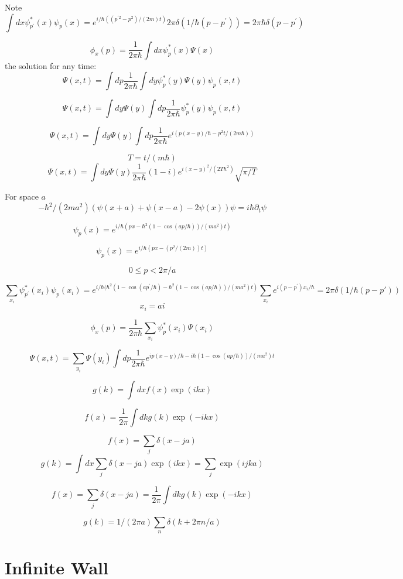 \documentclass[12pt,twoside]{article}
\begin{document}
Note
$$
\int dx \psi_{p^\prime}^*(x) \psi_{p}(x) = e^{ i/\hbar ((p^{\prime2} - p^2) /(2m)t)} 2\pi\delta(1/\hbar(p-p^\prime))
=2\pi\hbar\delta(p-p^\prime)
$$

$$
\phi_x(p) = \frac{1}{2\pi\hbar}\int dx \psi^*_p(x) \Psi(x)
$$
the solution for any time:
$$
\Psi(x, t) = \int dp \frac{1}{2\pi\hbar}\int dy \psi^*_p(y) \Psi(y) \psi_p(x,t)
$$

$$
\Psi(x, t) = \int dy  \Psi(y) \int dp \frac{1}{2\pi\hbar}\psi^*_p(y) \psi_p(x,t)
$$

$$
\Psi(x, t) = \int dy  \Psi(y) \int dp \frac{1}{2\pi\hbar} e^{i(p(x-y)/\hbar - p^2 t/(2m\hbar))}
$$

$$
T=t/(m\hbar)
$$
$$
\Psi(x, t) = \int dy  \Psi(y) \frac{1}{2\pi\hbar} (1-i) e^{i (x-y)^2 / (2 T \hbar^2)}  \sqrt{\pi / T}
$$


For space $a$
$$
-\hbar^2/(2m a^2) (\psi(x+a) + \psi(x-a) - 2\psi(x)) \psi = i \hbar \partial_t \psi
$$

$$
\psi_p(x) = e^{ i/\hbar (p x - \hbar^2(1 - \cos(a p/\hbar))/(m a^2)t)}
$$

$$
\psi_p(x) = e^{ i/\hbar (p x - (p^2/(2m))t)}
$$

$$
0 \le p < 2\pi / a
$$

$$
\sum_{x_i} \psi_{p^\prime}^*(x_i) \psi_{p}(x_i) = e^{ i/\hbar (\hbar^2(1 - \cos(a p^\prime/\hbar) - \hbar^2(1 - \cos(a p/\hbar))/(m a^2)t)}
\sum_{x_i}e^{i(p-p^\prime)x_i/\hbar} = 2\pi\delta(1/\hbar(p - p\prime))
$$
$$
x_i = ai
$$

$$
\phi_x(p) = \frac{1}{2\pi\hbar}\sum_{x_i} \psi^*_p(x_i) \Psi(x_i)
$$

$$
\Psi(x, t) = \sum_{y_i} \Psi(y_i) \int dp \frac{1}{2\pi\hbar} e^{ ip(x-y)/\hbar - i\hbar(1 - \cos(a p/\hbar))/(m a^2)t}
$$



$$
g(k) = \int dx f(x) \exp(ikx)
$$

$$
f(x) = \frac{1}{2\pi}\int dk g(k) \exp(-ikx)
$$

$$
f(x) = \sum_j \delta(x - ja)
$$
$$
g(k) = \int dx \sum_j \delta(x - ja) \exp(ikx) = \sum_j \exp(ijka)
$$

$$
f(x) = \sum_j \delta(x - ja) = \frac{1}{2\pi}\int dk g(k) \exp(-ikx)
$$

$$
g(k) = 1/(2\pi a)\sum_n \delta(k+2\pi n/a)
$$


\section{Infinite Wall}
\end{document}
